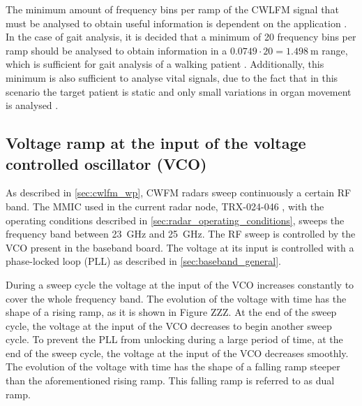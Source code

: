 The minimum amount of frequency bins per ramp of the CWLFM signal that must be analysed to obtain useful information is dependent on the application \cite{Richards2010}. In the case of gait analysis, it is decided that a minimum of 20 frequency bins per ramp should be analysed to obtain information in a $0.0749 \cdot 20 = \SI{1.498}{\metre}$ range, which is sufficient for gait analysis of a walking patient \cite{Amin2017, Richards2010}. Additionally, this minimum is also sufficient to analyse vital signals, due to the fact that in this scenario the target patient is static and only small variations in organ movement is analysed \cite{Amin2017}.




\subsection{Voltage ramp at the input of the voltage controlled oscillator (VCO)}  \label{sec:vco_characterisation}

As described in \cref{sec:cwlfm_wp}, CWFM radars sweep continuously a certain RF band. The MMIC used in the current radar node, TRX-024-046 \cite{SR2021}, with the operating conditions described in \cref{sec:radar_operating_conditions}, sweeps the frequency band between \SI{23}{\giga\hertz} and \SI{25}{\giga\hertz}. The RF sweep is controlled by the VCO present in the baseband board. The voltage at its input is controlled with a phase-locked loop (PLL) as described in \cref{sec:baseband_general}.

During a sweep cycle the voltage at the input of the VCO increases constantly to cover the whole frequency band. The evolution of the voltage with time has the shape of a rising ramp, as it is shown in Figure ZZZ. At the end of the sweep cycle, the voltage at the input of the VCO decreases to begin another sweep cycle. To prevent the PLL from unlocking during a large period of time, at the end of the sweep cycle, the voltage at the input of the VCO decreases smoothly. The evolution of the voltage with time has the shape of a falling ramp steeper than the aforementioned rising ramp. This falling ramp is referred to as dual ramp.

